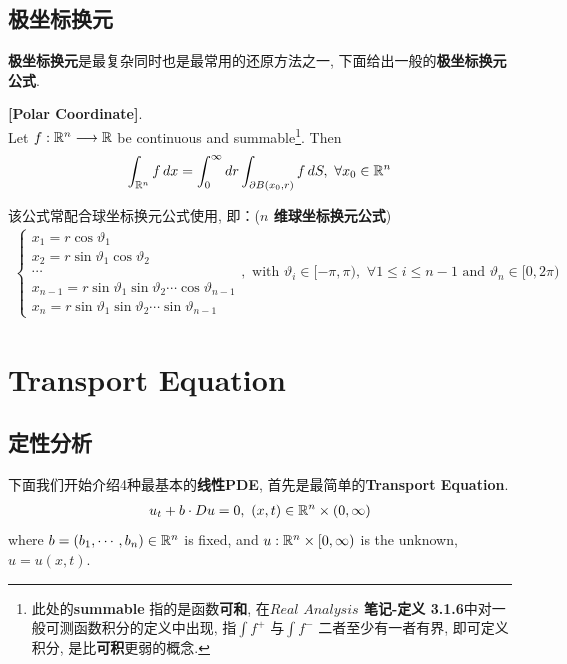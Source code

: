 \newpage

\subsection{极坐标换元}
	\textbf{极坐标换元}是最复杂同时也是最常用的还原方法之一, 下面给出一般的\textbf{极坐标换元公式}.
	\begin{thm}\label{thm 1.6.4}
		\textbf{[Polar Coordinate]}. \\
		Let $f : \mathbb{R}^n \longrightarrow \mathbb{R}$ be continuous and summable\footnote{此处的\textbf{summable} 指的是函数\textbf{可和}, 在\textbf{$Real \,\, Analysis$ 笔记-定义 3.1.6}中对一般可测函数积分的定义中出现, 指$\int f^+$ 与$\int f^-$ 二者至少有一者有界, 即可定义积分, 是比\textbf{可积}更弱的概念.}. Then
		\begin{align}
			\int_{\mathbb{R}^n} f \, dx = \int_{0}^{\infty} dr \int_{\partial B(x_0 , r)} f \, dS , \,\, \forall x_0 \in \mathbb{R}^n
		\end{align}
		
		\vspace{4em}
		
		\begin{rmk}
			该公式常配合球坐标换元公式使用, 即：(\textbf{$n$ 维球坐标换元公式})
			\begin{align}
				\begin{cases}
					x_1 = r \cos{\vartheta_1} \\
					x_2 = r \sin{\vartheta_1} \cos{\vartheta_2} \\
					\cdots \\
					x_{n - 1} = r \sin{\vartheta_1} \sin{\vartheta_2} \cdots \cos{\vartheta_{n - 1}} \\
					x_n = r \sin{\vartheta_1} \sin{\vartheta_2} \cdots \sin{\vartheta_{n - 1}}
				\end{cases} , 
			\,\, \text{with} \,\, 
			\vartheta_i \in [-\pi , \pi) , \,\, \forall 1 \leq i \leq n - 1 
			\,\, \text{and} \,\, 
			\vartheta_n \in [0 , 2\pi)
			\end{align}
		\end{rmk}
	\end{thm}

\newpage

\section{Transport Equation}
\subsection{定性分析}
	下面我们开始介绍4种最基本的\textbf{线性PDE}, 首先是最简单的\textbf{Transport Equation}. 
	\begin{align}
		u_t + b \cdot Du = 0 , \,\, (x , t) \in \mathbb{R}^n \times (0 , \infty)
	\end{align}
	where $b = (b_1 , \cdots , b_n) \in \mathbb{R}^n$ is fixed, and $u : \mathbb{R}^n \times [0 , \infty)$ is the unknown, $u = u(x , t)$. 
	
